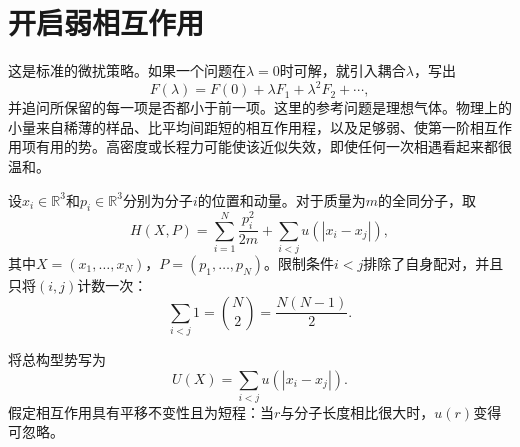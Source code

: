 \section{开启弱相互作用}

\begin{classroomqa}
\end{classroomqa}

这是标准的微扰策略。如果一个问题在\(\lambda=0\)时可解，就引入耦合\(\lambda\)，写出
\begin{equation}
 F(\lambda)=F(0)+\lambda F_1+\lambda^2F_2+\cdots,
 \label{eq:sm6-perturbative-template}
\end{equation}
并追问所保留的每一项是否都小于前一项。这里的参考问题是理想气体。物理上的小量来自稀薄的样品、比平均间距短的相互作用程，以及足够弱、使第一阶相互作用项有用的势。高密度或长程力可能使该近似失效，即使任何一次相遇看起来都很温和。

设\(x_i\in\mathbb R^3\)和\(p_i\in\mathbb R^3\)分别为分子\(i\)的位置和动量。对于质量为\(m\)的全同分子，取
\begin{equation}
 H(X,P)=
 \sum_{i=1}^{N}\frac{p_i^2}{2m}
 +\sum_{i<j}u\!\left(|x_i-x_j|\right),
 \label{eq:sm6-interacting-hamiltonian}
\end{equation}
其中\(X=(x_1,\ldots,x_N)\)，\(P=(p_1,\ldots,p_N)\)。限制条件\(i<j\)排除了自身配对，并且只将\((i,j)\)计数一次：
\begin{equation}
 \sum_{i<j}1=\binom{N}{2}=\frac{N(N-1)}{2}.
 \label{eq:sm6-pair-count}
\end{equation}

\begin{classroomqa}
\end{classroomqa}

将总构型势写为
\begin{equation}
 U(X)=\sum_{i<j}u\!\left(|x_i-x_j|\right).
 \label{eq:sm6-total-potential}
\end{equation}
假定相互作用具有平移不变性且为短程：当\(r\)与分子长度相比很大时，\(u(r)\)变得可忽略。


